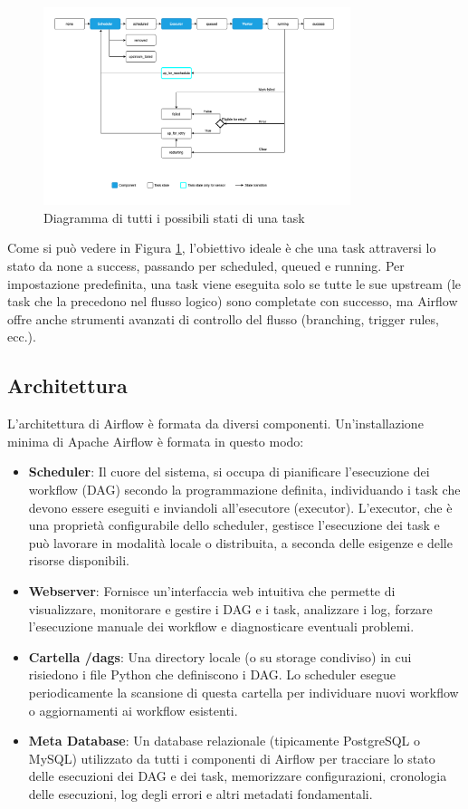 \begin{figure}[h]
    \centering
    \includegraphics[width=0.8\textwidth]{img/task_lifecycle_diagram.png}
    \caption{Diagramma di tutti i possibili stati di una task}
    \label{fig:task_lifecycle}
\end{figure}

Come si può vedere in Figura \ref{fig:task_lifecycle}, l'obiettivo ideale è che una task attraversi lo stato da none a success, passando per scheduled, queued e running. Per impostazione predefinita, una task viene eseguita solo se tutte le sue upstream (le task che la precedono nel flusso logico) sono completate con successo, ma Airflow offre anche strumenti avanzati di controllo del flusso (branching, trigger rules, ecc.).


\subsection{Architettura}
\label{sec:architettura}
L'architettura di Airflow è formata da diversi componenti. Un'installazione minima di Apache Airflow è formata in questo modo: 

\begin{itemize}
    \item \textbf{Scheduler}: Il cuore del sistema, si occupa di pianificare l'esecuzione dei workflow (DAG) secondo la programmazione definita, individuando i task che devono essere eseguiti e inviandoli all'esecutore (executor). L'executor, che è una proprietà configurabile dello scheduler, gestisce l'esecuzione dei task e può lavorare in modalità locale o distribuita, a seconda delle esigenze e delle risorse disponibili.
    \item \textbf{Webserver}: Fornisce un'interfaccia web intuitiva che permette di visualizzare, monitorare e gestire i DAG e i task, analizzare i log, forzare l'esecuzione manuale dei workflow e diagnosticare eventuali problemi.
    \item \textbf{Cartella /dags}: Una directory locale (o su storage condiviso) in cui risiedono i file Python che definiscono i DAG. Lo scheduler esegue periodicamente la scansione di questa cartella per individuare nuovi workflow o aggiornamenti ai workflow esistenti.
    \item \textbf{Meta Database}: Un database relazionale (tipicamente PostgreSQL o MySQL) utilizzato da tutti i componenti di Airflow per tracciare lo stato delle esecuzioni dei DAG e dei task, memorizzare configurazioni, cronologia delle esecuzioni, log degli errori e altri metadati fondamentali.
\end{itemize}

